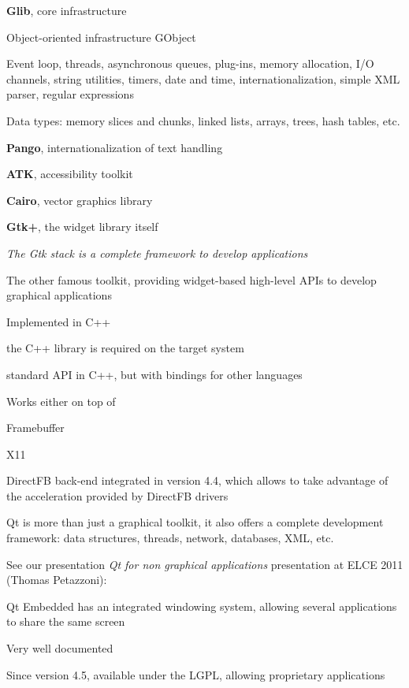   \startitemize
  \item {\bf Glib}, core infrastructure
    \startitemize
    \item Object-oriented infrastructure GObject
    \item Event loop, threads, asynchronous queues, plug-ins, memory
      allocation, I/O channels, string utilities, timers, date and
      time, internationalization, simple XML parser, regular
      expressions
    \item Data types: memory slices and chunks, linked lists, arrays,
      trees, hash tables, etc.
    \stopitemize
  \item {\bf Pango}, internationalization of text handling
  \item {\bf ATK}, accessibility toolkit
  \item {\bf Cairo}, vector graphics library
  \item {\bf Gtk+}, the widget library itself
  \item {\em The Gtk stack is a complete framework to develop applications}
  \stopitemize

  \startitemize
  \item The other famous toolkit, providing widget-based high-level APIs to
    develop graphical applications
  \item Implemented in C++
    \startitemize
    \item the C++ library is required on the target system
    \item standard API in C++, but with bindings for other languages
    \stopitemize
  \item Works either on top of
    \startitemize
    \item Framebuffer
    \item X11
    \item DirectFB back-end integrated in version 4.4, which allows to take
      advantage of the acceleration provided by DirectFB drivers
    \stopitemize
  \stopitemize

  \startitemize
  \item Qt is more than just a graphical toolkit, it also offers a
    complete development framework: data structures, threads, network,
    databases, XML, etc.
  \item See our presentation {\em Qt for non graphical applications}
    presentation at ELCE 2011 (Thomas Petazzoni):
  \item Qt Embedded has an integrated windowing system, allowing
    several applications to share the same screen
  \item Very well documented
  \item Since version 4.5, available under the LGPL, allowing
    proprietary applications
  \stopitemize

